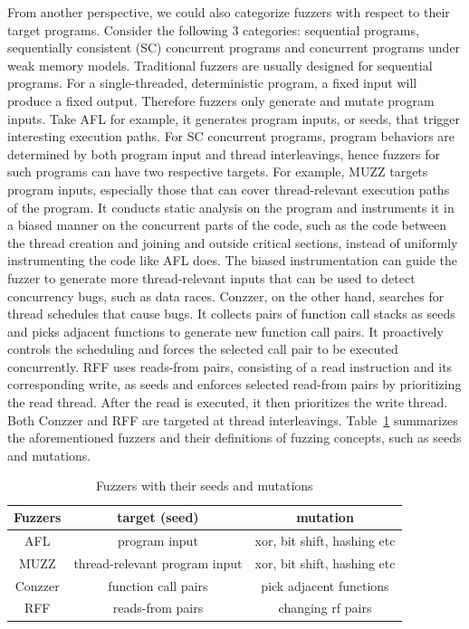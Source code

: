 From another perspective, we could also categorize fuzzers with respect to their target programs. Consider the following 3 categories: sequential programs, sequentially consistent (SC) concurrent programs and concurrent programs under weak memory models. Traditional fuzzers are usually designed for sequential programs. For a single-threaded, deterministic program, a fixed input will produce a fixed output. Therefore fuzzers only generate and mutate program inputs. Take AFL for example, it generates program inputs, or seeds, that trigger interesting execution paths. For SC concurrent programs, program behaviors are determined by both program input and thread interleavings, hence fuzzers for such programs can have two respective targets. For example, MUZZ\cite{muzz} targets program inputs, especially those that can cover thread-relevant execution paths of the program. It conducts static analysis on the program and instruments it in a biased manner on the concurrent parts of the code, such as the code between the thread creation and joining and outside critical sections, instead of uniformly instrumenting the code like AFL does. The biased instrumentation can guide the fuzzer to generate more thread-relevant inputs that can be used to detect concurrency bugs, such as data races. Conzzer\cite{conzzer}, on the other hand, searches for thread schedules that cause bugs. It collects pairs of function call stacks as seeds and picks adjacent functions to generate new function call pairs. It proactively controls the scheduling and forces the selected call pair to be executed concurrently. RFF\cite{rff} uses reads-from pairs, consisting of a read instruction and its corresponding write, as seeds and enforces selected read-from pairs by prioritizing the read thread. After the read is executed, it then prioritizes the write thread. Both Conzzer and RFF are targeted at thread interleavings. Table~\ref{fuzzer-concepts} summarizes the aforementioned fuzzers and their definitions of fuzzing concepts, such as seeds and mutations.


\begin{table}[h!]
	\centering
	\begin{tabular}{ |c|cc| }
		\hline
		Fuzzers & target (seed)                 & mutation                    \\
		\hline
		AFL     & program input                 & xor, bit shift, hashing etc \\
		MUZZ    & thread-relevant program input & xor, bit shift, hashing etc \\
		Conzzer & function call pairs           & pick adjacent functions     \\
		RFF     & reads-from pairs              & changing rf pairs           \\

		\hline
	\end{tabular}
	\caption{Fuzzers with their seeds and mutations}
	\label{fuzzer-concepts}
\end{table}

